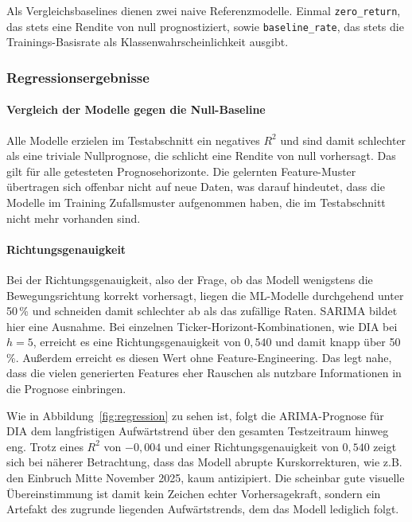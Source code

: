 Als Vergleichsbaselines dienen zwei naive Referenzmodelle. Einmal \texttt{zero\_return}, das stets eine Rendite von null prognostiziert, sowie \texttt{baseline\_rate}, das stets die Trainings-Basisrate als Klassenwahrscheinlichkeit ausgibt.

\subsubsection{Regressionsergebnisse}



\paragraph{Vergleich der Modelle gegen die Null-Baseline}

Alle Modelle erzielen im Testabschnitt ein negatives $R^2$ und sind damit schlechter als eine triviale Nullprognose, die schlicht eine Rendite von null vorhersagt. Das gilt für alle getesteten Prognosehorizonte. Die gelernten Feature-Muster übertragen sich offenbar nicht auf neue Daten, was darauf hindeutet, dass die Modelle im Training Zufallsmuster aufgenommen haben, die im Testabschnitt nicht mehr vorhanden sind.

\paragraph{Richtungsgenauigkeit}
Bei der Richtungsgenauigkeit, also der Frage, ob das Modell wenigstens die Bewegungsrichtung korrekt vorhersagt, liegen die ML-Modelle durchgehend unter 50\,\% und schneiden damit schlechter ab als das zufällige Raten. SARIMA bildet hier eine Ausnahme. Bei einzelnen Ticker-Horizont-Kombinationen, wie $\mathrm{DIA}$ bei $h=5$, erreicht es eine Richtungsgenauigkeit von $0{,}540$ und damit knapp über 50\,\%. Außerdem erreicht es diesen Wert ohne Feature-Engineering. Das legt nahe, dass die vielen generierten Features eher Rauschen als nutzbare Informationen in die Prognose einbringen.

Wie in Abbildung~\ref{fig:regression} zu sehen ist, folgt die ARIMA-Prognose für DIA dem langfristigen Aufwärtstrend über den gesamten Testzeitraum hinweg eng. Trotz eines $R^2$ von $-0{,}004$ und einer Richtungsgenauigkeit von $0{,}540$ zeigt sich bei näherer Betrachtung, dass das Modell abrupte 
Kurskorrekturen, wie z.B. den Einbruch Mitte November 2025, kaum antizipiert. Die scheinbar gute visuelle Übereinstimmung ist damit kein Zeichen echter Vorhersagekraft, sondern ein Artefakt des zugrunde liegenden Aufwärtstrends, dem das Modell lediglich folgt.

